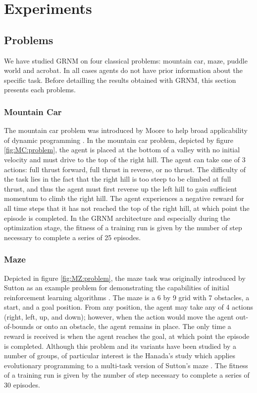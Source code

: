 \section{Experiments}


\subsection{Problems}

We have studied GRNM on four classical problems: mountain car, maze, puddle world and acrobat. In all cases agents do not have prior information about the specific task. Before detailling the results obtained with GRNM, this section presents each problems.
\subsubsection{Mountain Car}
The mountain car problem was introduced by Moore to help broad applicability of dynamic programming \cite{Moore1991}. In the mountain car problem, depicted by figure \ref{fig:MC:problem}, the agent is placed at the bottom of a valley with no initial velocity and must drive to the top of the right hill. The agent can take one of 3 actions: full thrust forward, full thrust in reverse, or no thrust. The difficulty of the task lies in the fact that the right hill is too steep to be climbed at full thrust, and thus the agent must first reverse up the left hill to gain sufficient momentum to climb the right hill. The agent experiences a negative reward for all time steps that it has not reached the top of the right hill, at which point the episode is completed. In the GRNM architecture and especially during the optimization stage, the fitness of a training run is given by the number of step necessary to complete a series of 25 episodes.

\subsubsection{Maze}

Depicted in figure \ref{fig:MZ:problem}, the maze task was originally introduced by Sutton as an example problem for demonstrating the capabilities of initial reinforcement learning algorithms \cite{Sutton1990}. The maze is a 6 by 9 grid with 7 obstacles, a start, and a goal position. From any position, the agent may take any of 4 actions (right, left, up, and down); however, when the action would move the agent out-of-bounds or onto an obstacle, the agent remains in place. The only time a reward is received is when the agent reaches the goal, at which point the episode is completed. Although this problem and its variants have been studied by a number of groups, of particular interest is the Hanada's study which applies evolutionary programming to a multi-task version of Sutton's maze \cite{Handa2007}. The fitness of a training run is given by the number of step necessary to complete a series of 30 episodes.

